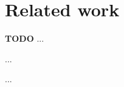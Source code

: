 
\section{Related work}
\textbf{TODO}
...
\cite{multidigit_streetview}

...
\cite{FornesCnnCategorization}

...
\cite{AttendAndTell}